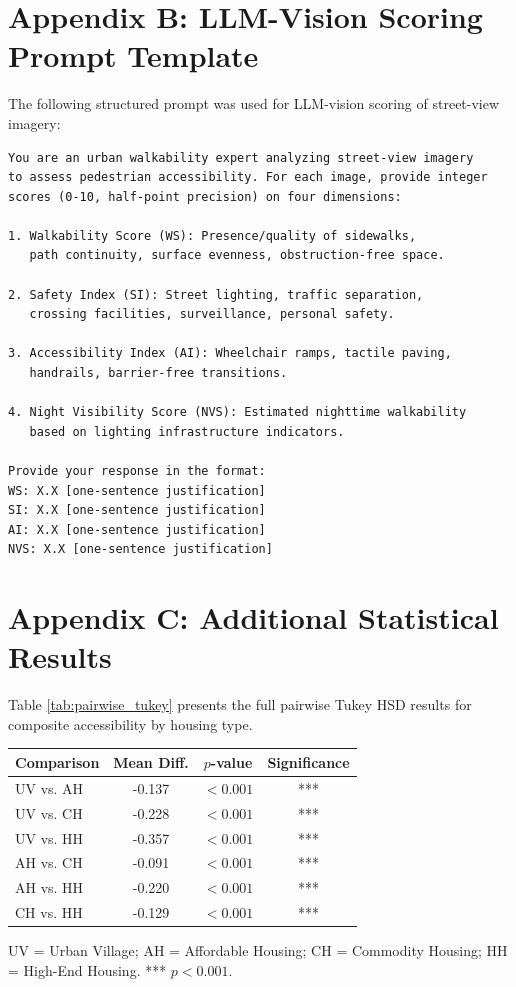 \documentclass[preprint,12pt,authoryear]{elsarticle}
\begin{document}
\section{Appendix B: LLM-Vision Scoring Prompt Template}
\label{appendix:prompt_template}

The following structured prompt was used for LLM-vision scoring of street-view imagery:

\begin{verbatim}
You are an urban walkability expert analyzing street-view imagery 
to assess pedestrian accessibility. For each image, provide integer 
scores (0-10, half-point precision) on four dimensions:

1. Walkability Score (WS): Presence/quality of sidewalks, 
   path continuity, surface evenness, obstruction-free space.

2. Safety Index (SI): Street lighting, traffic separation, 
   crossing facilities, surveillance, personal safety.

3. Accessibility Index (AI): Wheelchair ramps, tactile paving, 
   handrails, barrier-free transitions.

4. Night Visibility Score (NVS): Estimated nighttime walkability 
   based on lighting infrastructure indicators.

Provide your response in the format:
WS: X.X [one-sentence justification]
SI: X.X [one-sentence justification]
AI: X.X [one-sentence justification]
NVS: X.X [one-sentence justification]
\end{verbatim}

\section{Appendix C: Additional Statistical Results}
\label{appendix:additional_stats}

Table \ref{tab:pairwise_tukey} presents the full pairwise Tukey HSD results for composite accessibility by housing type.

\begin{threeparttable}
\caption{Pairwise Tukey HSD Comparisons of Composite Accessibility by Housing Type}
\label{tab:pairwise_tukey}
\begin{tabular}{lccc}
\toprule
Comparison & Mean Diff. & $p$-value & Significance \\
\midrule
UV vs. AH & -0.137 & $< 0.001$ & *** \\
UV vs. CH & -0.228 & $< 0.001$ & *** \\
UV vs. HH & -0.357 & $< 0.001$ & *** \\
AH vs. CH & -0.091 & $< 0.001$ & *** \\
AH vs. HH & -0.220 & $< 0.001$ & *** \\
CH vs. HH & -0.129 & $< 0.001$ & *** \\
\bottomrule
\end{tabular}
\begin{tablenotes}
\item UV = Urban Village; AH = Affordable Housing; CH = Commodity Housing; HH = High-End Housing. *** $p < 0.001$.
\end{tablenotes}
\end{threeparttable}
\end{document}
